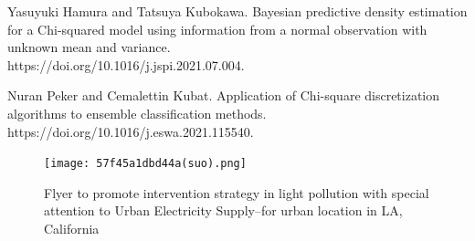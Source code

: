 \documentclass{mcmthesis}
\begin{document}
\begin{thebibliography}{99}
 Yasuyuki Hamura and Tatsuya Kubokawa. Bayesian predictive density estimation for a Chi-squared model using information from a normal observation with unknown mean and variance. \\https://doi.org/10.1016/j.jspi.2021.07.004.

 Nuran Peker and Cemalettin Kubat. Application of Chi-square discretization algorithms to ensemble classification methods. \\https://doi.org/10.1016/j.eswa.2021.115540.

\end{thebibliography}

\begin{figure}
    \centering
    \texttt{[image: 57f45a1dbd44a(suo).png]}
    \caption{Flyer to promote intervention strategy in light pollution with special attention to Urban Electricity Supply--for urban location in LA, California}
    \label{fig:my_label}
\end{figure}
\end{document}
